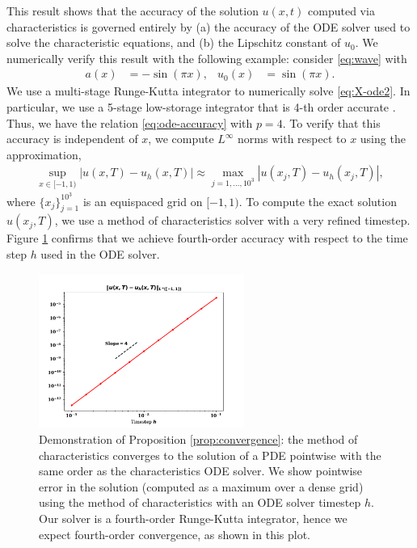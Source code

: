 \documentclass[11pt]{amsart}
\begin{document}
  This result shows that the accuracy of the solution $u(x,t)$ computed via characteristics is governed entirely by (a) the accuracy of the ODE solver used to solve the characteristic equations, and (b) the Lipschitz constant of $u_0$. We numerically verify this result with the following example: consider \eqref{eq:wave} with 
  \begin{align*}
    a(x) &= -\sin(\pi x), & u_0(x) &= \sin(\pi x).
  \end{align*}
  We use a multi-stage Runge-Kutta integrator to numerically solve \eqref{eq:X-ode2}. In particular, we use a 5-stage low-storage integrator that is 4-th order accurate \cite{carpenter-kennedy-lserk}. Thus, we have the relation \eqref{eq:ode-accuracy} with $p = 4$. To verify that this accuracy is independent of $x$, we compute $L^\infty$ norms with respect to $x$ using the approximation,
  \begin{align*}
    \sup_{x \in [-1,1)} | u(x,T) - u_h(x,T) | \approx \max_{j=1, \ldots, 10^3} |u(x_j,T) - u_h(x_j,T)|,
  \end{align*}
  where $\{x_j\}_{j=1}^{10^3}$ is an equispaced grid on $[-1,1)$. To compute the exact solution $u(x_j,T)$, we use a method of characteristics solver with a very refined timestep.  Figure \ref{fig:f2} confirms that we achieve fourth-order accuracy with respect to the time step $h$ used in the ODE solver. 
\begin{figure}
  \begin{center}
  \includegraphics[width=0.6\textwidth]{convergence-plot.pdf}
  \end{center}
  \caption{Demonstration of Proposition \ref{prop:convergence}: the method of characteristics converges to the solution of a PDE pointwise with the same order as the characteristics ODE solver. We show pointwise error in the solution (computed as a maximum over a dense grid) using the method of characteristics with an ODE solver timestep $h$. Our solver is a fourth-order Runge-Kutta integrator, hence we expect fourth-order convergence, as shown in this plot.}\label{fig:f2}
\end{figure}



\end{document}

